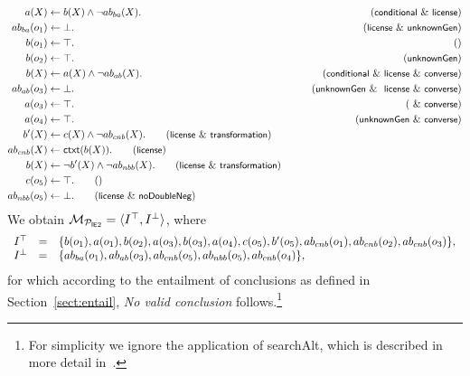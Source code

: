 \documentclass[12pt]{article}
\begin{document}
\begin{align}
a(X) & \leftarrow b(X) \wedge \neg \Ab_{ba}(X). & \tag{\conditionals\ \&\ \licenses}\\
\Ab_{ba}(o_1) & \leftarrow  \bot. & \tag{\licenses\ \& \unknownGen}\\
b(o_1) & \leftarrow  \top. & \tag{} \\
b(o_2) & \leftarrow  \top. & \tag{\unknownGen}
\medskip \\
b(X) & \leftarrow a(X) \wedge \neg \Ab_{ab}(X). & \tag{\conditionals\ \&\ \licenses\ \&\ \converse}\\
\Ab_{ab}(o_3) & \leftarrow  \bot. & \tag{\unknownGen\ \& \ \licenses\ \&\ \converse}\\
a(o_3) & \leftarrow  \top. & \tag{\ \&\ \converse} \\
a(o_4) & \leftarrow  \top. & \tag{\unknownGen\ \& \converse} 
\medskip \\
b'(X) & \leftarrow c(X) \wedge \neg \Ab_{cnb}(X).  \tag{\licenses\ \&\ \transformation} \\
\Ab_{cnb}(X)  & \leftarrow \cxt(b(X)).\tag{\licenses} \\
b(X) & \leftarrow \neg b'(X) \wedge \neg \Ab_{nbb}(X). \tag{\licenses\ \&\ \transformation} \\
c(o_5) & \leftarrow \top. \tag{} \\
\Ab_{nbb}(o_5) & \leftarrow \bot. \tag{\licenses\ \&\  \dnegation}
\end{align}
We obtain ${\cal M}_{{\cal P}_{\tiny\mbox{\textsf{I}\textsf{E}2}}} = \langle I^\top, I^\bot \rangle$, where 
\[
\begin{array}{lll}
 I^\top & = & \{ b(o_1), a(o_1), b(o_2), a(o_3), b(o_3),  a(o_4), c(o_5), b'(o_5), ab_{cnb}(o_1), ab_{cnb}(o_2), ab_{cnb}(o_3)  \}, \\
I^\bot & = & \{ ab_{ba}(o_1), ab_{ab}(o_3), ab_{cnb}(o_5), ab_{nbb}(o_5), ab_{cnb}(o_4) \}, 
\end{array}
\]
for which according to the entailment of conclusions as defined in Section~\ref{sect:entail}, \textit{No valid conclusion}
follows.\footnote{For simplicity we ignore the application of {\footnotesize\textsf{searchAlt}}, which is described in more detail in~\cite{cogsci:2017}.}
\end{document}
